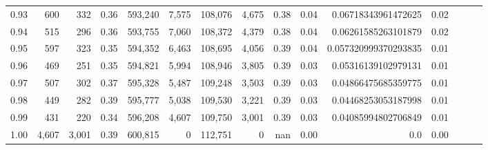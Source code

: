 \begin{tabular}{rrrrrrrrrrrrrrr}
0.93 &     600 &    332 &  0.36 &  593,240 &    7,575 &  108,076 &    4,675 &  0.38 &  0.04 &   0.06718343961472625 &      0.02 \\
0.94 &     515 &    296 &  0.36 &  593,755 &    7,060 &  108,372 &    4,379 &  0.38 &  0.04 &   0.06261585263101879 &      0.02 \\
0.95 &     597 &    323 &  0.35 &  594,352 &    6,463 &  108,695 &    4,056 &  0.39 &  0.04 &  0.057320999370293835 &      0.01 \\
0.96 &     469 &    251 &  0.35 &  594,821 &    5,994 &  108,946 &    3,805 &  0.39 &  0.03 &   0.05316139102979131 &      0.01 \\
0.97 &     507 &    302 &  0.37 &  595,328 &    5,487 &  109,248 &    3,503 &  0.39 &  0.03 &   0.04866475685359775 &      0.01 \\
0.98 &     449 &    282 &  0.39 &  595,777 &    5,038 &  109,530 &    3,221 &  0.39 &  0.03 &   0.04468253053187998 &      0.01 \\
0.99 &     431 &    220 &  0.34 &  596,208 &    4,607 &  109,750 &    3,001 &  0.39 &  0.03 &   0.04085994802706849 &      0.01 \\
1.00 &   4,607 &  3,001 &  0.39 &  600,815 &        0 &  112,751 &        0 &   nan &  0.00 &                   0.0 &      0.00 \\
\bottomrule
\end{tabular}
